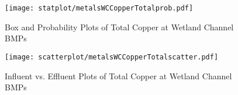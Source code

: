         \begin{figure}[hb]   %
            \centering
            \texttt{[image: statplot/metalsWCCopperTotalprob.pdf]}
            \caption{Box and Probability Plots of Total Copper at Wetland Channel BMPs}
        \end{figure}         %
        
        
        \begin{figure}[hb]   %
            \centering
            \texttt{[image: scatterplot/metalsWCCopperTotalscatter.pdf]}
            \caption{Influent vs. Effluent Plots of Total Copper at Wetland Channel BMPs}
        \end{figure}         %
        \clearpage
        